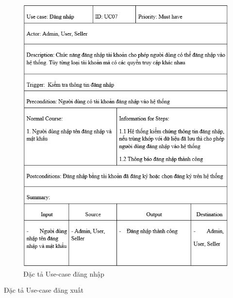 \documentclass{article}
\begin{document}
{{{{{{{	\begin{center}
		\begin{figure}[htp]
			\begin{center}
				\includegraphics[scale=.865]{anh17.png}
			\end{center}
			\caption{Đặc tả Use-case đăng nhập}
			
		\end{figure}
	\end{center}
\newpage
{\large Đặc tả Use-case đăng xuất
	
}}}}}}}}
\end{document}
